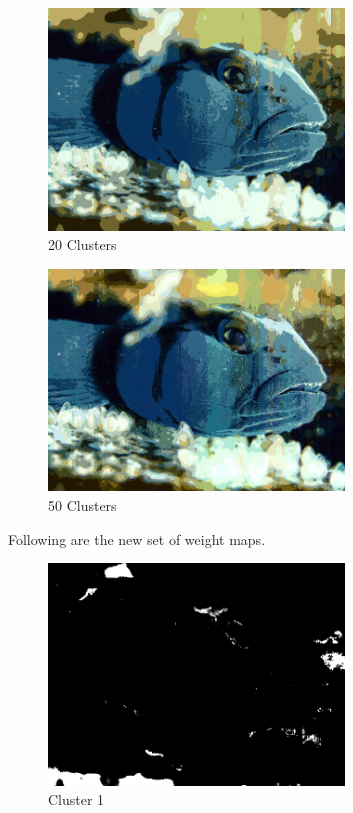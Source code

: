 \documentclass{article}      %
\begin{document}
\begin{figure}[H]
\centering
\includegraphics[width=0.7\textwidth]{partd_20_means}
\caption{20 Clusters}
\end{figure}

\begin{figure}[H]
\centering
\includegraphics[width=0.7\textwidth]{partd_50_means}
\caption{50 Clusters}
\end{figure}

Following are the new set of weight maps.

\begin{figure}[H]
\centering
\includegraphics[width=0.7\textwidth]{partd_wts_cluster0}
\caption{Cluster 1}
\end{figure}
\end{document}
